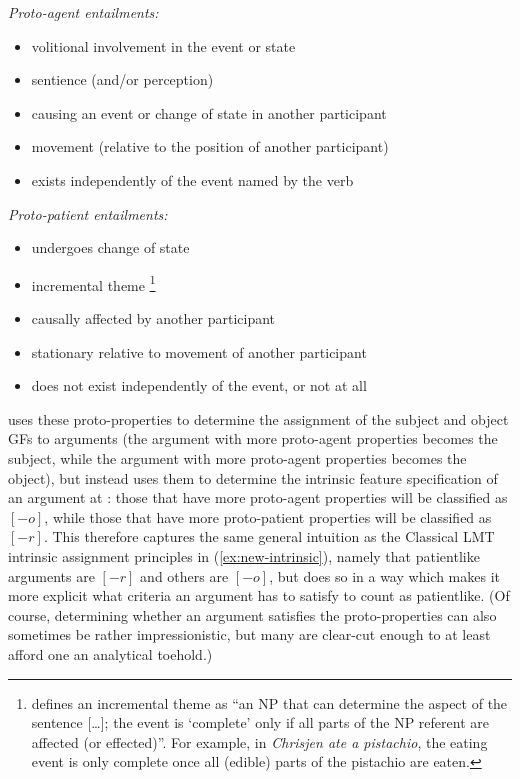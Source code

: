 \documentclass[output=paper]{langscibook}
\begin{document}
\ea\label{protoagententailments}
\textit{Proto-agent entailments:}\\
\begin{itemize}
  \item volitional involvement in the event or state
  \item sentience (and/or perception)
  \item causing an event or change of state in another participant
  \item movement (relative to the position of another participant)
  \item exists independently of the event named by the verb
\end{itemize}
\z

\newpage
\ea\label{protopatiententailments}
\textit{Proto-patient entailments:} \\
\begin{itemize}
  \item undergoes change of state
  \item incremental theme%
%
        \footnote{\citet[588]{Dowty1991} defines an incremental theme as ``an NP
        that can determine the aspect of the sentence [\dots]; the event is
        `complete' only if all parts of the NP referent are affected (or
        effected)''. For example, in \textit{Chrisjen ate a pistachio}, the
        eating event is only complete once all (edible) parts of the pistachio
        are eaten.}
%
  \item causally affected by another participant
  \item stationary relative to movement of another participant
  \item does not exist independently of the event, or not at all
\end{itemize}
\z


\citet[576]{Dowty1991} uses these proto-properties to determine the assignment
of the subject and object GFs to arguments (the argument with more proto-agent
properties becomes the subject, while the argument with more proto-agent
properties becomes the object), but \citet[149]{zaenen93} instead uses them to
determine the intrinsic feature specification of an argument at \astruc: those
that have more proto-agent properties will be classified as $[-o]$, while those
that have more proto-patient properties will be classified as $[-r]$. This
therefore captures the same general intuition as the Classical LMT intrinsic
assignment principles in (\ref{ex:new-intrinsic}), namely that patientlike
arguments are $[-r]$ and others are $[-o]$, but does so in a way which makes it
more explicit what criteria an argument has to satisfy to count as patientlike.
(Of course, determining whether an argument satisfies the proto-properties can
also sometimes be rather impressionistic, but many are clear-cut enough to at
least afford one an analytical toehold.)
\end{document}
